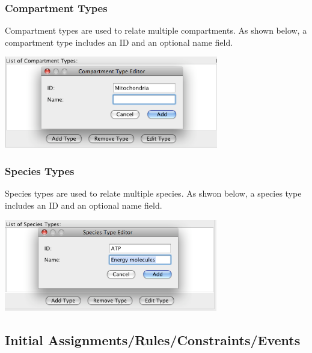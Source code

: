 \documentclass[titlepage,11pt]{article}
\begin{document}
\subsubsection{\label{compTypes}Compartment Types}

\noindent
Compartment types are used to relate multiple compartments.  As shown
below, a compartment type includes an ID and an optional name field.
\begin{center}
\includegraphics[height=40mm]{screenshots/compType}
\end{center}

\subsubsection{\label{specTypes}Species Types}

\noindent
Species types are used to relate multiple species.  As shwon below, a 
species type includes an ID and an optional name field.
\begin{center}
\includegraphics[height=40mm]{screenshots/specType}
\end{center}

\subsection{\label{InitRuleConstEvent}Initial Assignments/Rules/Constraints/Events}
\end{document}
